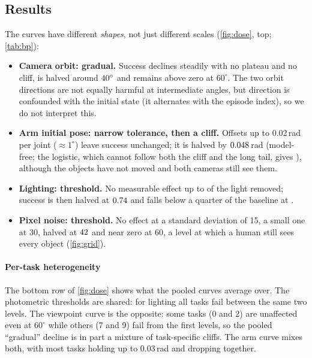 \documentclass[10pt,twocolumn,letterpaper]{article}
\begin{document}
\subsection{Results}


\begin{table}[t]
\centering
\caption{\textbf{Breaking points}, with 95\% task-bootstrap intervals. Levels include the unperturbed one.}
\label{tab:bp}
\scriptsize
\setlength{\tabcolsep}{3pt}

\end{table}

The curves have different \emph{shapes}, not just different scales (\cref{fig:dose}, top; \cref{tab:bp}):
\begin{itemize}
  \item \textbf{Camera orbit: gradual.} Success declines steadily with no plateau and no cliff, is halved
  around $40^\circ$ and remains above zero at $60^\circ$. The two orbit directions are not equally
  harmful at intermediate angles, but direction is confounded with the initial state (it alternates with
  the episode index), so we do not interpret this.
  \item \textbf{Arm initial pose: narrow tolerance, then a cliff.} Offsets up to 0.02\,rad per joint
  ($\approx1^\circ$) leave success unchanged; it is halved by $0.048$\,rad \RobotXfiftyInterpCI{}
  (model-free; the logistic, which cannot follow both the cliff and the long tail, gives \RobotXfifty{}),
  although the objects have not moved and both cameras still see them.
  \item \textbf{Lighting: threshold.} No measurable effect up to \LightCliffLow{} of the light removed;
  success is then halved at $0.74$ and falls below a quarter of the baseline at \LightCliffHigh{}.
  \item \textbf{Pixel noise: threshold.} No effect at a standard deviation of 15, a small one at 30, halved
  at $42$ \NoiseXfiftyInterpCI{} and near zero at 60, a level at which a human still sees
  every object (\cref{fig:grid}).
\end{itemize}



\paragraph{Per-task heterogeneity} The bottom row of \cref{fig:dose} shows what the pooled curves average over. The
photometric thresholds are shared: for lighting all tasks fail between the same two levels. The viewpoint
curve is the opposite: some tasks (0 and 2) are unaffected even at $60^\circ$ while others (7 and 9) fail from
the first levels, so the pooled ``gradual'' decline is in part a mixture of task-specific cliffs. The arm
curve mixes both, with most tasks holding up to 0.03\,rad and dropping together.
\end{document}

